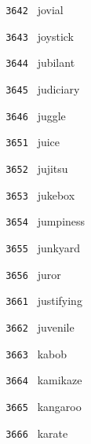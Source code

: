 \documentclass[11pt]{article}
\begin{document}
\begin{multicols}{6}
\noindent \texttt{ 3642 } \hspace{1mm} jovial  \par
\noindent \texttt{ 3643 } \hspace{1mm} joystick  \par
\noindent \texttt{ 3644 } \hspace{1mm} jubilant  \par
\noindent \texttt{ 3645 } \hspace{1mm} judiciary  \par
\noindent \texttt{ 3646 } \hspace{1mm} juggle  \par
\noindent \texttt{ 3651 } \hspace{1mm} juice  \par
\noindent \texttt{ 3652 } \hspace{1mm} jujitsu  \par
\noindent \texttt{ 3653 } \hspace{1mm} jukebox  \par
\noindent \texttt{ 3654 } \hspace{1mm} jumpiness  \par
\noindent \texttt{ 3655 } \hspace{1mm} junkyard  \par
\noindent \texttt{ 3656 } \hspace{1mm} juror  \par
\noindent \texttt{ 3661 } \hspace{1mm} justifying  \par
\noindent \texttt{ 3662 } \hspace{1mm} juvenile  \par
\noindent \texttt{ 3663 } \hspace{1mm} kabob  \par
\noindent \texttt{ 3664 } \hspace{1mm} kamikaze  \par
\noindent \texttt{ 3665 } \hspace{1mm} kangaroo  \par
\noindent \texttt{ 3666 } \hspace{1mm} karate  \par
\end{multicols}
\end{document}
